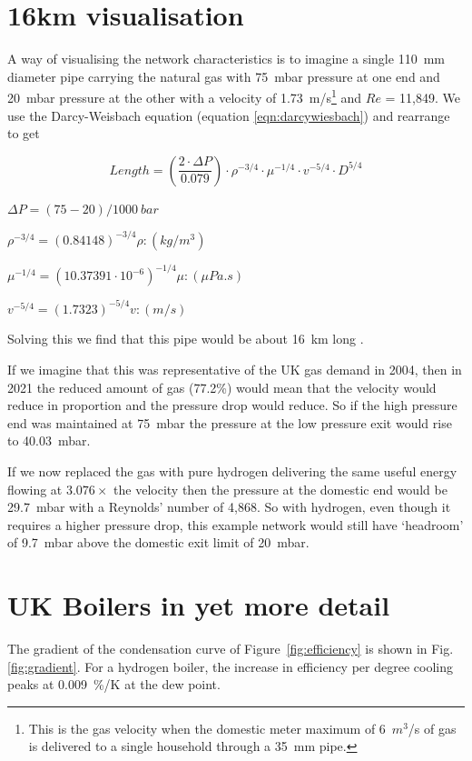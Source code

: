 \documentclass[5p]{elsarticle} %
\begin{document}
\section{16km visualisation}
\label{sec:18km}
A way of visualising the network characteristics is to imagine a single 110~mm diameter pipe carrying the natural gas with 75~mbar pressure at one end and 20~mbar pressure at the other with a velocity of 1.73~m/s\footnote{
This is the gas velocity when the domestic meter maximum of 6~$m^3$/s of gas is delivered to a single household through a 35~mm pipe.
}  and $Re$ = 11,849. We use the Darcy-Weisbach equation (equation \eqref{eqn:darcywiesbach}) and rearrange to get


\begin{equation}
\label{eqn:18km0}
Length = \left ( \frac{2 \cdot \Delta P}{0.079}\right ) \cdot \rho^{-3/4} \cdot \mu^{-1/4} \cdot v^{-5/4}  \cdot D^{5/4}
\end{equation}

$ \Delta P = (75 - 20)/1000~bar$

$ \rho^{-3/4} = (0.84148)^{-3/4} \rho: (kg/m^3)$

$ \mu^{-1/4} = (10.37391 \cdot 10^{-6})^{-1/4} \mu:  (\mu Pa.s)$

$ v^{-5/4} = (1.7323)^{-5/4} v: (m/s)$

Solving this we find that this pipe would be about 16~km long .

If we imagine that this was representative of the UK gas demand in 2004, then in 2021 the reduced amount of gas (77.2\%) would mean that the velocity would reduce in proportion and the pressure drop would reduce. So if the high pressure end was maintained at 75~mbar the  pressure at the low pressure exit would rise to 40.03~mbar. 

If we now replaced the gas with pure hydrogen  delivering the same useful energy flowing at $3.076\times$ the velocity then the pressure at the domestic end would be 29.7~mbar with a Reynolds' number of 4,868.
So with hydrogen, even though it requires a higher pressure drop, this example network would still have `headroom' of 9.7~mbar above the domestic exit limit of 20~mbar.

\section{UK Boilers in yet more detail}
\label{appendix:yetmore-boilers}

The gradient of the condensation curve of Figure~\ref{fig:efficiency} is shown in Fig. \ref{fig:gradient}. For a hydrogen boiler, the increase in efficiency per degree cooling peaks at 0.009~\%/K at the dew point.
\end{document}
